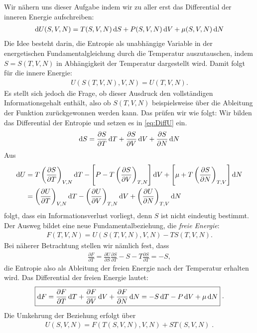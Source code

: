 Wir nähern uns dieser Aufgabe indem wir zu aller erst das Differential der inneren Energie aufschreiben:
\begin{align}
    \label{eq:DiffU}
    \mathop{}\!\mathrm{d} U(S,V,N)=T(S,V,N)\mathop{}\!\mathrm{d} S+P(S,V,N)\mathop{}\!\mathrm{d} V+\mu(S,V,N)\mathop{}\!\mathrm{d} N
\end{align}
Die Idee besteht darin, die Entropie als unabhängige Variable in der energetischen Fundamentalgleichung durch die Temperatur auszutauschen, indem $S=S(T,V,N)$ in Abhängigkeit der Temperatur dargestellt wird. Damit folgt für die innere Energie:
\begin{align*}
    U(S(T,V,N),V,N)=U(T,V,N).
\end{align*}  
Es stellt sich jedoch die Frage, ob dieser Ausdruck den vollständigen Informationsgehalt enthält, also ob $S(T,V,N)$ beispielsweise über die Ableitung der Funktion zurückgewonnen werden kann.
Das prüfen wir wie folgt: Wir bilden das Differential der Entropie und setzen es in \ref{eq:DiffU} ein.
\begin{align*}
    \mathop{}\!\mathrm{d} S=\frac{\partial S}{\partial T}\mathop{}\!\mathrm{d} T+\frac{\partial S}{\partial V}\mathop{}\!\mathrm{d} V+\frac{\partial S}{\partial N}\mathop{}\!\mathrm{d} N
\end{align*}
Aus
\begin{align*}
    \mathop{}\!\mathrm{d} U &= T\left(\frac{\partial S}{\partial T}\right)_{V,N}\mathop{}\!\mathrm{d} T-\left[P-T\left(\frac{\partial S}{\partial V}\right)_{T,N}\right]\mathop{}\!\mathrm{d} V+\left[\mu+T\left(\frac{\partial S}{\partial N}\right)_{T,V}\right]\mathop{}\!\mathrm{d} N\\
    &=\left(\frac{\partial U}{\partial T}\right)_{V,N}\mathop{}\!\mathrm{d} T-\left(\frac{\partial U}{\partial V}\right)_{T,N}\mathop{}\!\mathrm{d} V+\left(\frac{\partial U}{\partial N}\right)_{T,V}\mathop{}\!\mathrm{d} N
\end{align*}
folgt, dass ein Informationsverlust vorliegt, denn $S$ ist nicht eindeutig bestimmt.
Der Ausweg bildet eine neue Fundamentalbeziehung, die \emph{freie Energie}:
\begin{align*}
    \boxed{F(T,V,N)=U(S(T,V,N),V,N)-TS(T,V,N)}.
\end{align*}
Bei näherer Betrachtung stellen wir nämlich fest, dass
\begin{align*}
    \frac{\partial  F}{\partial T}=\frac{\partial U}{\partial S}\frac{\partial S}{\partial T}-S-T\frac{\partial S}{\partial T}=-S,
\end{align*}
die Entropie also als Ableitung der freien Energie nach der Temperatur erhalten wird.
Das Differential der freien Energie lautet:
\begin{align*}
    \boxed{  
        \begin{aligned}
         \mathop{}\!\mathrm{d} F = \frac{\partial F}{\partial T}\mathop{}\!\mathrm{d} T +\frac{\partial F}{\partial V}\mathop{}\!\mathrm{d} V+\frac{\partial F}{\partial N}\mathop{}\!\mathrm{d} N=-S\mathop{}\!\mathrm{d} T - P\mathop{}\!\mathrm{d} V+\mu \mathop{}\!\mathrm{d} N   
        \end{aligned} 
    }\;.
\end{align*}
Die Umkehrung der Beziehung erfolgt über
\begin{align*}
    \boxed{U(S,V,N)=F(T(S,V,N),V,N)+ST(S,V,N)}\;.
\end{align*}
